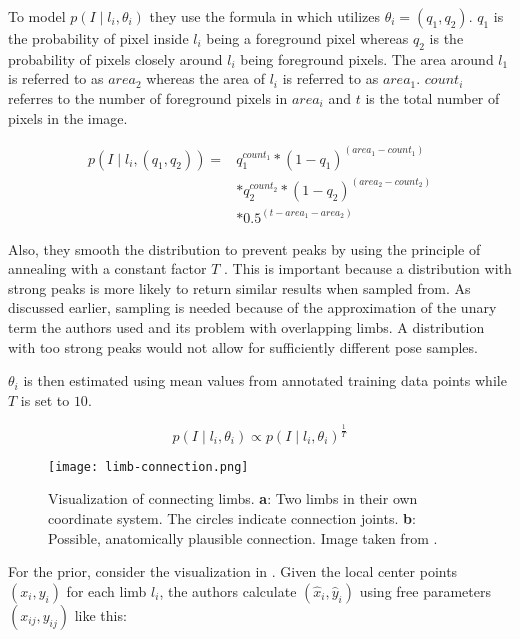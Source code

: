 To model $p(I \mid l_i, \theta_i)$ they use the formula in  which utilizes $\theta_i = (q_1, q_2)$.
$q_1$ is the probability of pixel inside $l_i$ being a foreground pixel whereas $q_2$ is the probability of pixels closely around $l_i$ being foreground pixels.
The area around $l_1$ is referred to as $area_2$ whereas the area of $l_i$ is referred to as $area_1$.
$count_i$ referres to the number of foreground pixels in $area_i$ and $t$ is the total number of pixels in the image.

\begin{equation}
    \label{eq:felz-unary}
    \begin{split}
        p(I \mid l_i, (q_1, q_2)) = &q_1^{count_1} * (1 - q_1)^{(area_1 - count_1)} \\ 
        &* q_2^{count_2} * (1 - q_2)^{(area_2 - count_2)} \\ 
        &* 0.5^{(t - area_1 - area_2)}
    \end{split}
\end{equation}

Also, they smooth the distribution to prevent peaks by using the principle of annealing with a constant factor $T$ .
This is important because a distribution with strong peaks is more likely to return similar results when sampled from.
As discussed earlier, sampling is needed because of the approximation of the unary term the authors used and its problem with overlapping limbs.
A distribution with too strong peaks would not allow for sufficiently different pose samples.

$\theta_i$ is then estimated using mean values from annotated training data points while $T$ is set to $10$.

\begin{equation}
    \label{eq:smoothed}
    p(I \mid l_i, \theta_i) \propto p(I \mid l_i, \theta_i)^{\frac{1}{T}}
\end{equation}

\begin{figure}[htb!]
    \centering
    \texttt{[image: limb-connection.png]}
    \caption{Visualization of connecting limbs. \textbf{a}: Two limbs in their own coordinate system. The circles indicate connection joints. \textbf{b}: Possible, anatomically plausible connection. Image taken from \cite{felzenszwalb_pictorial_2005}.}
    \label{fig:limb-connection}
\end{figure}

For the prior, consider the visualization in .
Given the local center points $(x_i, y_i)$ for each limb $l_i$, the authors calculate $(\hat{x}_i, \hat{y}_i)$ using free parameters $(x_{ij}, y_{ij})$ like this:

